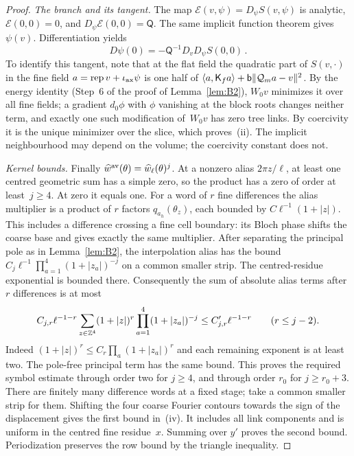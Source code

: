 \begin{proof}
\emph{The branch and its tangent.} The map $\mathcal E(v,\psi)=D_\psi S(v,\psi)$ is analytic, $\mathcal E(0,0)=0$, and $D_\psi\mathcal E(0,0)=\mathsf Q$. The same implicit function theorem gives $\psi(v)$. Differentiation yields
\begin{equation*}
D\psi(0)=-\mathsf Q^{-1}D_vD_\psi S(0,0)\,.
\end{equation*}
To identify this tangent, note that at the flat field the quadratic part of $S(v,\cdot)$ in the fine field $a=\operatorname{rep}v+\iota_{\rm ax}\psi$ is one half of $\langle a,\mathsf K_fa\rangle+\mathsf{b}\|\mathcal Q_ma-v\|^2$. By the energy identity (Step~6 of the proof of Lemma~\ref{lem:B2}), $W_0v$ minimizes it over all fine fields; a gradient $d_0\phi$ with $\phi$ vanishing at the block roots changes neither term, and exactly one such modification of~$W_0v$ has zero tree links. By coercivity it is the unique minimizer over the slice, which proves~(ii). The implicit neighbourhood may depend on the volume; the coercivity constant does not.

\emph{Kernel bounds.} Finally $\widehat w^{\rm av}(\theta)=\widehat w_\ell(\theta)^j$. At a nonzero alias $2\pi z/\ell$, at least one centred geometric sum has a simple zero, so the product has a zero of order at least~$j\ge4$. At zero it equals one. For a word of $r$ fine differences the alias multiplier is a product of $r$ factors $q_{a_h}(\theta_z)$, each bounded by $C\ell^{-1}(1+|z|)$. This includes a difference crossing a fine cell boundary: its Bloch phase shifts the coarse base and gives exactly the same multiplier. After separating the principal pole as in Lemma~\ref{lem:B2}, the interpolation alias has the bound $C_j\ell^{-1}\prod_{a=1}^4(1+|z_a|)^{-j}$ on a common smaller strip. The centred-residue exponential is bounded there. Consequently the sum of absolute alias terms after $r$ differences is at most
\begin{equation*}
C_{j,r}\ell^{-1-r}\sum_{z\in\mathbb{Z}^4}(1+|z|)^r
 \prod_{a=1}^4(1+|z_a|)^{-j}
\le C'_{j,r}\ell^{-1-r}\qquad(r\le j-2).
\end{equation*}
Indeed $(1+|z|)^r\le C_r\prod_a(1+|z_a|)^r$ and each remaining exponent is at least two. The pole-free principal term has the same bound. This proves the required symbol estimate through order two for $j\ge4$, and through order $r_0$ for $j\ge r_0+3$. There are finitely many difference words at a fixed stage; take a common smaller strip for them. Shifting the four coarse Fourier contours towards the sign of the displacement gives the first bound in~(iv). It includes all link components and is uniform in the centred fine residue~$x$. Summing over $y'$ proves the second bound. Periodization preserves the row bound by the triangle inequality.


\end{proof}

